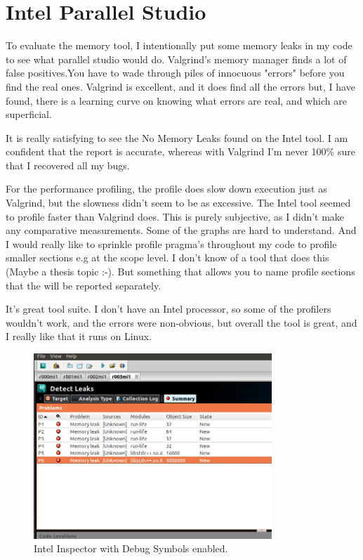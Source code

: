 \documentclass[journal,10pt,onecolumn,draftcls]{IEEEtran}
\begin{document}
\appendices
\section{Intel Parallel Studio}
To evaluate the memory tool, I intentionally put some memory leaks in my code 
to see what parallel studio would do.  Valgrind's memory manager finds a lot of 
false positives.You have to wade through piles of innocuous "errors" before you 
find the real ones. Valgrind is excellent, and it does find all the errors but, 
I have found, there is a learning curve on knowing what errors are real, and 
which are superficial. 

It is really satisfying to see the No Memory Leaks found on the Intel tool. I am 
confident that the report is accurate, whereas with Valgrind I'm never 100\% sure that I recovered all my bugs.

For the performance profiling, the profile does slow down execution just as 
Valgrind, but the slowness didn't seem to be as excessive.  The Intel tool 
seemed to profile faster than Valgrind does.  This is purely subjective, as 
I didn't make any comparative measurements.  Some of the graphs are hard to 
understand. And I would really like to sprinkle profile pragma's throughout my 
code to profile smaller sections e.g at the scope level. I don't know of a tool 
that does this (Maybe a thesis topic :-).  But something that allows you to name 
profile sections that the will be reported separately.  

It's great tool suite. I don't have an Intel processor, so some of the profilers 
wouldn't work, and the errors were non-obvious, but overall the tool is great, and 
I really like that it runs on Linux.

\begin{figure}[htb]
\label{fig:intentional_memory_leak}
\begin{center}
\includegraphics[width=0.8\textwidth]{figures/fileMep7k0_Memory_Analysis.png}
\caption{Intel Inspector with Debug Symbols enabled.}
\end{center}
\end{figure}


\listoffigures

\end{document}
